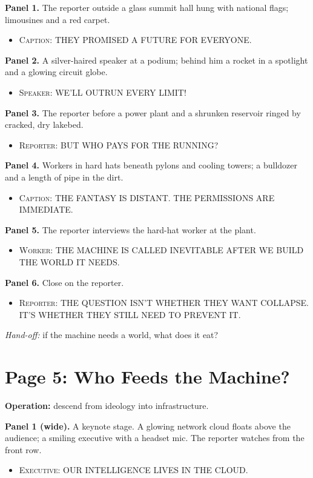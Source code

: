 \documentclass[11pt]{article}
\newcommand{\op}[1]{\textbf{Operation:} #1\par}
\newcommand{\panel}[2]{\textbf{#1.} #2\par}
\newenvironment{lines}{\begin{itemize}[label={},leftmargin=1.5em,itemsep=0.05em,topsep=0.1em]}{\end{itemize}}
\newcommand{\say}[2]{\item \textsc{#1}: \textsf{\small #2}}
\newcommand{\handoff}[1]{\emph{Hand-off:} #1\par}
\begin{document}
\panel{Panel 1}{The reporter outside a glass summit hall hung with national flags; limousines and a red carpet.}
\begin{lines}\say{Caption}{THEY PROMISED A FUTURE FOR EVERYONE.}\end{lines}

\panel{Panel 2}{A silver-haired speaker at a podium; behind him a rocket in a spotlight and a glowing circuit globe.}
\begin{lines}\say{Speaker}{WE'LL OUTRUN EVERY LIMIT!}\end{lines}

\panel{Panel 3}{The reporter before a power plant and a shrunken reservoir ringed by cracked, dry lakebed.}
\begin{lines}\say{Reporter}{BUT WHO PAYS FOR THE RUNNING?}\end{lines}

\panel{Panel 4}{Workers in hard hats beneath pylons and cooling towers; a bulldozer and a length of pipe in the dirt.}
\begin{lines}\say{Caption}{THE FANTASY IS DISTANT. THE PERMISSIONS ARE IMMEDIATE.}\end{lines}

\panel{Panel 5}{The reporter interviews the hard-hat worker at the plant.}
\begin{lines}\say{Worker}{THE MACHINE IS CALLED INEVITABLE AFTER WE BUILD THE WORLD IT NEEDS.}\end{lines}

\panel{Panel 6}{Close on the reporter.}
\begin{lines}\say{Reporter}{THE QUESTION ISN'T WHETHER THEY WANT COLLAPSE. IT'S WHETHER THEY STILL NEED TO PREVENT IT.}\end{lines}

\handoff{if the machine needs a world, what does it eat?}

\section{Page 5: Who Feeds the Machine?}

\op{descend from ideology into infrastructure.}

\panel{Panel 1 (wide)}{A keynote stage. A glowing network cloud floats above the audience; a smiling executive with a headset mic. The reporter watches from the front row.}
\begin{lines}\say{Executive}{OUR INTELLIGENCE LIVES IN THE CLOUD.}\end{lines}
\end{document}
